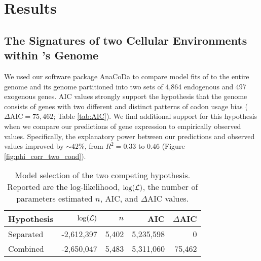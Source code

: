 
\section{Results}
\subsection{The Signatures of two Cellular Environments within \kluyveri's Genome}
We used our software package AnaCoDa \citep{landerer2018} to compare model fits of \ROC to the entire \kluyveri genome and its genome partitioned into two sets of 4,864 endogenous and 497 exogenous genes.
AIC values strongly support the hypothesis that the \kluyveri genome consists of genes with two different and distinct patterns of codon usage bias ($\Delta\text{AIC} = 75,462$; Table \ref{tab:AIC}).
We find additional support for this hypothesis when we compare our predictions of gene expression to empirically observed values.
Specifically, the explanatory power between our predictions and observed values improved by $\sim 42\%$, from $R^2 = 0.33$ to $0.46$ (Figure \ref{fig:phi_corr_two_cond}).

\begin{table}[h]
  \centering
  \caption{Model selection of the two competing hypothesis. 
  Reported are the log-likelihood, $\log(\mathcal{L})$, the number of parameters estimated $n$, AIC, and $\Delta$AIC values.}
  \begin{tabular}{lrrrr}
    \hline
    Hypothesis             & $\log(\mathcal{L})$ &$n$ &  AIC & $\Delta$AIC\\ \hline 
    Separated		   & -2,612,397 & 5,402 & 5,235,598&      0\\
    Combined               & -2,650,047 & 5,483 & 5,311,060& 75,462\\ \hline
  \end{tabular}
  \label{tab:AIC_klu}
\end{table}
\clearpage

